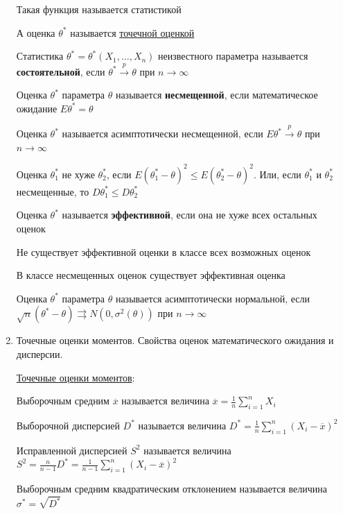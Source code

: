 \begin{enumerate}
    \Defs Такая функция называется статистикой
    
    \Defs А оценка $\theta^*$ называется \hyperlink{point_estimation}{точечной оценкой}

    \Defs Статистика $\theta^* = \theta^*(X_1, \dots, X_n)$ неизвестного параметра называется
    \textbf{состоятельной}, если $\theta^* \overset{p}{\longrightarrow} \theta$ при $n \to \infty$

    \Defs Оценка $\theta^*$ параметра $\theta$ называется \textbf{несмещенной}, если 
    математическое ожидание $E \theta^* = \theta$
        
    \Notas Оценка $\theta^*$ называется асимптотически несмещенной, если 
    $E \theta^* \overset{p}{\longrightarrow} \theta$ при $n \to \infty$

    \Defs Оценка $\theta^*_1$ не хуже $\theta^*_2$, если $E (\theta^*_1 - \theta)^2 \leq E (\theta^*_2 - \theta)^2$.
    Или, если $\theta^*_1$ и $\theta^*_2$ несмещенные, то $D \theta^*_1 \leq D \theta^*_2$

    \Defs Оценка $\theta^*$ называется \textbf{эффективной}, если она не хуже всех остальных оценок

    \Notas Не существует эффективной оценки в классе всех возможных оценок

    \begin{MyTheorem}
        \Ths В классе несмещенных оценок существует эффективная оценка
    \end{MyTheorem}

    \Defs Оценка $\theta^*$ параметра $\theta$ называется асимптотически нормальной, если 
    $\sqrt{n} (\theta^* - \theta) \rightrightarrows N(0, \sigma^2 (\theta))$ при $n \to \infty$

    \item Точечные оценки моментов. Свойства оценок математического ожидания и дисперсии.

    \hyperlink{moments_point_estimation}{Точечные оценки моментов}:

    \Defs Выборочным средним $\overline{x}$ называется величина $\overline{x} = \frac{1}{n} \sum_{i = 1}^n X_i$

    \Defs Выборочной дисперсией $D^*$ называется величина $D^* = \frac{1}{n} \sum_{i = 1}^n (X_i - \overline{x})^2$

    \Defs Исправленной дисперсией $S^2$ называется величина $S^2 = \frac{n}{n - 1} D^* = \frac{1}{n - 1} \sum_{i = 1}^n (X_i - \overline{x})^2$

    \Defs Выборочным средним квадратическим отклонением называется величина $\sigma^* = \sqrt{D^*}$


\end{enumerate}

